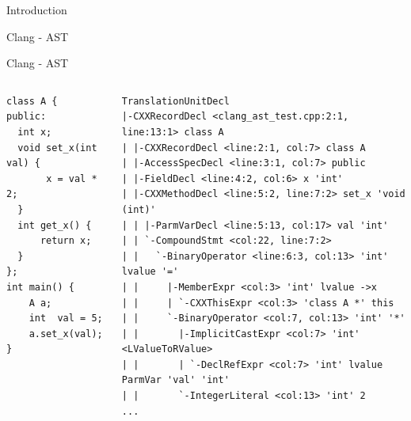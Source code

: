 \documentclass[xcolor=dvipsnames]{beamer}
\begin{document}
\begin{section}{Introduction}
\begin{frame}{\hskip 0.3cm Clang - AST}
\end{frame}














\begin{frame}[fragile]{\hskip 0.3cm Clang - AST}

\begin{columns}

\begin{column}{4cm}
\begin{lstlisting}[language=CCC]
class A {
public:
  int x;
  void set_x(int val) {
       x = val * 2;
  }	
  int get_x() {
      return x;
  }
};
int main() {
    A a;
    int  val = 5;
    a.set_x(val);
}
\end{lstlisting}
\end{column}

\begin{column}{7.3cm}

\begin{lstlisting}[language=AST]
TranslationUnitDecl
|-CXXRecordDecl <clang_ast_test.cpp:2:1, line:13:1> class A
| |-CXXRecordDecl <line:2:1, col:7> class A
| |-AccessSpecDecl <line:3:1, col:7> public
| |-FieldDecl <line:4:2, col:6> x 'int'
| |-CXXMethodDecl <line:5:2, line:7:2> set_x 'void (int)'
| | |-ParmVarDecl <line:5:13, col:17> val 'int'
| | `-CompoundStmt <col:22, line:7:2>
| |   `-BinaryOperator <line:6:3, col:13> 'int' lvalue '='
| |     |-MemberExpr <col:3> 'int' lvalue ->x
| |     | `-CXXThisExpr <col:3> 'class A *' this
| |     `-BinaryOperator <col:7, col:13> 'int' '*'
| |       |-ImplicitCastExpr <col:7> 'int' <LValueToRValue>
| |       | `-DeclRefExpr <col:7> 'int' lvalue ParmVar 'val' 'int'
| |       `-IntegerLiteral <col:13> 'int' 2
...
\end{lstlisting}
\end{column}

\end{columns}


\end{frame}








\end{section}
\end{document}
